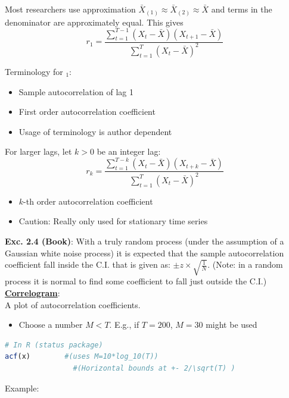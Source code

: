 Most researchers use approximation $\bar{X}_{(1)} \approx \bar{X}_{(2)} \approx \bar{X} $ and terms in the denominator are approximately equal. This gives 
\[r_1=\frac{\sum_{t=1}^{T-1} (X_t-\bar{X})(X_{t+1}-\bar{X})}{\sum_{t=1}^{T} (X_t-\bar{X})^2}\]

Terminology for $_1$:
\begin{itemize}
    \item Sample autocorrelation of lag 1
    \item First order autocorrelation coefficient
    \item Usage of terminology is author dependent
\end{itemize}

For larger lags, let $k>0$ be an integer lag:
\[r_k=\frac{\sum_{t=1}^{T-k} (X_t-\bar{X})(X_{t+k}-\bar{X})}{\sum_{t=1}^{T} (X_t-\bar{X})^2}\]

\begin{itemize}
    \item $k$-th order autocorrelation coefficient
    \item Caution: Really only used for stationary time series
\end{itemize}

\textbf{Exc. 2.4 (Book)}: With a truly random process (under the assumption of a Gaussian white noise process) it is expected that the sample autocorrelation coefficient fall inside the C.I. that is given as: $\pm z\times \sqrt{\frac{1}{N}}$. (Note: in a random process it is normal to find some coefficient to fall just outside the C.I.)\\


\textbf{\underline{Correlogram}}: \\

A plot of autocorrelation coefficients.

\begin{itemize}
    \item Choose a number $M<T$. E.g., if $T=200$, $M=30$ might be used
\end{itemize}

\begin{lstlisting}[language=R]
# In R (status package)
acf(x)        #(uses M=10*log_10(T))
                #(Horizontal bounds at +- 2/\sqrt(T) )
\end{lstlisting}

Example:

